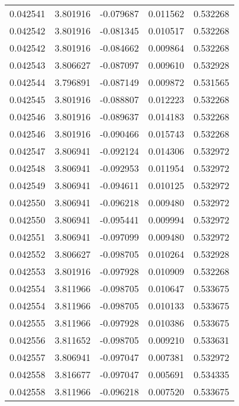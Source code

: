 \begin{tabular}{lrrrr}
0.042541    &  3.801916 & -0.079687 &  0.011562 &             0.532268 \\
0.042542    &  3.801916 & -0.081345 &  0.010517 &             0.532268 \\
0.042542    &  3.801916 & -0.084662 &  0.009864 &             0.532268 \\
0.042543    &  3.806627 & -0.087097 &  0.009610 &             0.532928 \\
0.042544    &  3.796891 & -0.087149 &  0.009872 &             0.531565 \\
0.042545    &  3.801916 & -0.088807 &  0.012223 &             0.532268 \\
0.042546    &  3.801916 & -0.089637 &  0.014183 &             0.532268 \\
0.042546    &  3.801916 & -0.090466 &  0.015743 &             0.532268 \\
0.042547    &  3.806941 & -0.092124 &  0.014306 &             0.532972 \\
0.042548    &  3.806941 & -0.092953 &  0.011954 &             0.532972 \\
0.042549    &  3.806941 & -0.094611 &  0.010125 &             0.532972 \\
0.042550    &  3.806941 & -0.096218 &  0.009480 &             0.532972 \\
0.042550    &  3.806941 & -0.095441 &  0.009994 &             0.532972 \\
0.042551    &  3.806941 & -0.097099 &  0.009480 &             0.532972 \\
0.042552    &  3.806627 & -0.098705 &  0.010264 &             0.532928 \\
0.042553    &  3.801916 & -0.097928 &  0.010909 &             0.532268 \\
0.042554    &  3.811966 & -0.098705 &  0.010647 &             0.533675 \\
0.042554    &  3.811966 & -0.098705 &  0.010133 &             0.533675 \\
0.042555    &  3.811966 & -0.097928 &  0.010386 &             0.533675 \\
0.042556    &  3.811652 & -0.098705 &  0.009210 &             0.533631 \\
0.042557    &  3.806941 & -0.097047 &  0.007381 &             0.532972 \\
0.042558    &  3.816677 & -0.097047 &  0.005691 &             0.534335 \\
0.042558    &  3.811966 & -0.096218 &  0.007520 &             0.533675 \\

\end{tabular}
